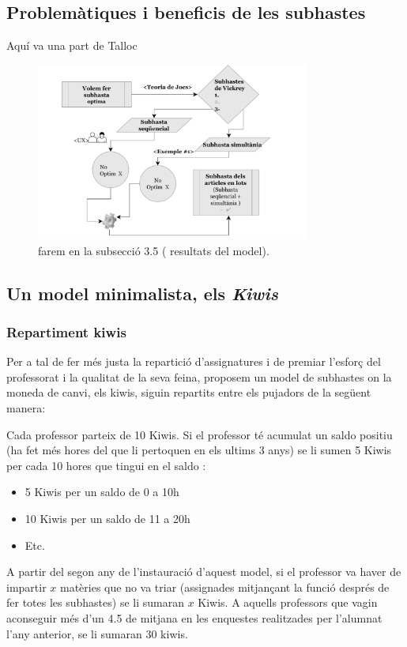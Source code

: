 \documentclass[10pt,twocolumn]{article}
\begin{document}
\subsection{Problemàtiques i beneficis de les subhastes}
Aquí va una part de Talloc
\begin{figure}[ht]
	\centering
	\includegraphics[width=9cm]{subs}
	\caption{ \footnotesize farem en la subsecció 3.5 ( resultats del model).}
	\label{fig:4}
\end{figure}
\subsection{Un model minimalista, els \textit{Kiwis}}
\subsubsection{Repartiment kiwis}
Per a tal de fer més justa la repartició d'assignatures i de premiar l'esforç del professorat i la qualitat de la seva feina, proposem un model de subhastes on la moneda de canvi, els kiwis, siguin repartits entre els pujadors de la següent manera:

Cada professor parteix de 10 Kiwis.
Si el professor té acumulat un saldo positiu (ha fet més hores del que li pertoquen en els ultims 3 anys) se li sumen 5 Kiwis per cada 10 hores que tingui en el saldo : 
\begin{itemize}
	\item 5 Kiwis per un saldo de 0 a 10h
	\item 10 Kiwis per un saldo de 11 a 20h
	\item  Etc.
\end{itemize}
A partir del segon any de l'instauració d'aquest model, si el professor va haver de impartir $x$ matèries que no va triar (assignades mitjançant la funció després de fer totes les subhastes) se li sumaran $x$ Kiwis. A aquells professors que vagin aconseguir més d'un 4.5 de mitjana en les enquestes realitzades per l'alumnat l'any anterior,  se li sumaran 30 kiwis. 
\end{document}

